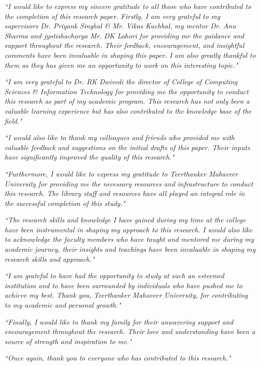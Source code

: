 \textit{``I would like to express my sincere gratitude to all those who have contributed to the completion of this research paper. Firstly, I am very grateful to my supervisors Dr. Priyank Singhal \& Mr. Vikas Kuchhal, my mentor Dr. Anu Sharma and jyotishacharya Mr. DK Lahori for providing me the guidance and support throughout the research. Their feedback, encouragement, and insightful comments have been invaluable in shaping this paper. I am also greatly thankful to them as they has given me an opportunity to work on this interesting topic."}

\textit{``I am very grateful to Dr. RK Dwivedi the director of College of Computing Sciences \& Information Technology for providing me the opportunity to conduct this research as part of my academic program. This research has not only been a valuable learning experience but has also contributed to the knowledge base of the field."}

\textit{``I would also like to thank my colleagues and friends who provided me with valuable feedback and suggestions on the initial drafts of this paper. Their inputs have significantly improved the quality of this research."}

\textit{``Furthermore, I would like to express my gratitude to Teerthanker Mahaveer University for providing me the necessary resources and infrastructure to conduct this research. The library staff and resources have all played an integral role in the successful completion of this study."}

\textit{``The research skills and knowledge I have gained during my time at the college have been instrumental in shaping my approach to this research. I would also like to acknowledge the faculty members who have taught and mentored me during my academic journey, their insights and teachings have been invaluable in shaping my research skills and approach."}

\textit{``I am grateful to have had the opportunity to study at such an esteemed institution and to have been surrounded by individuals who have pushed me to achieve my best. Thank you, Teerthanker Mahaveer University, for contributing to my academic and personal growth."}

\textit{``Finally, I would like to thank my family for their unwavering support and encouragement throughout the research. Their love and understanding have been a source of strength and inspiration to me."}

\textit{``Once again, thank you to everyone who has contributed to this research."}
